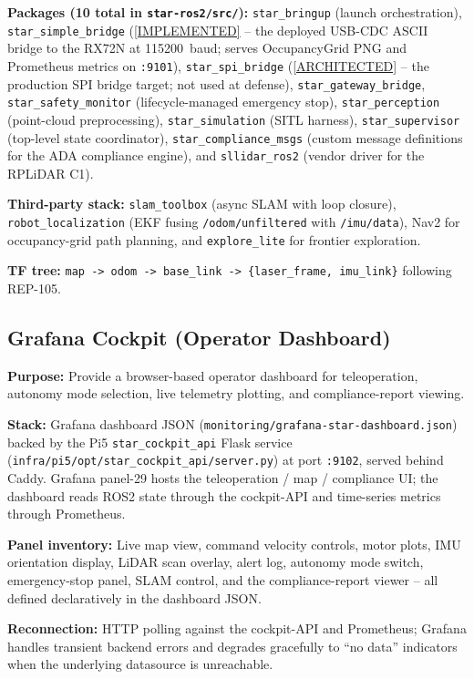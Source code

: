 \documentclass[11pt,letterpaper]{article}
\newcommand{\statuslabel}[1]{\hyperref[sec:status-legend]{[#1]}}
\begin{document}
\textbf{Packages (10 total in \texttt{star-ros2/src/}):}
\texttt{star\_bringup} (launch orchestration),
\texttt{star\_simple\_bridge} (\statuslabel{IMPLEMENTED} -- the deployed
USB-CDC ASCII bridge to the RX72N at 115200~baud; serves
OccupancyGrid PNG and Prometheus metrics on \texttt{:9101}),
\texttt{star\_spi\_bridge} (\statuslabel{ARCHITECTED} -- the production
SPI bridge target; not used at defense),
\texttt{star\_gateway\_bridge}, \texttt{star\_safety\_monitor}
(lifecycle-managed emergency stop), \texttt{star\_perception}
(point-cloud preprocessing), \texttt{star\_simulation} (SITL harness),
\texttt{star\_supervisor} (top-level state coordinator),
\texttt{star\_compliance\_msgs} (custom message definitions for the
ADA compliance engine), and \texttt{sllidar\_ros2} (vendor driver for
the RPLiDAR C1).

\textbf{Third-party stack:} \texttt{slam\_toolbox} (async SLAM with
loop closure), \texttt{robot\_localization} (EKF fusing
\texttt{/odom/unfiltered} with \texttt{/imu/data}), Nav2 for
occupancy-grid path planning, and \texttt{explore\_lite} for frontier
exploration.

\textbf{TF tree:} \texttt{map -> odom -> base\_link -> \{laser\_frame,
imu\_link\}} following REP-105.

\subsection{Grafana Cockpit (Operator Dashboard)}
\textbf{Purpose:} Provide a browser-based operator dashboard for
teleoperation, autonomy mode selection, live telemetry plotting, and
compliance-report viewing.

\textbf{Stack:} Grafana dashboard JSON
(\texttt{monitoring/grafana-star-dashboard.json}) backed by the Pi5
\texttt{star\_cockpit\_api} Flask service
(\texttt{infra/pi5/opt/star\_cockpit\_api/server.py}) at port
\texttt{:9102}, served behind Caddy. Grafana panel-29 hosts the
teleoperation / map / compliance UI; the dashboard reads ROS2 state
through the cockpit-API and time-series metrics through Prometheus.

\textbf{Panel inventory:} Live map view, command velocity controls,
motor plots, IMU orientation display, LiDAR scan overlay, alert log,
autonomy mode switch, emergency-stop panel, SLAM control, and the
compliance-report viewer -- all defined declaratively in the
dashboard JSON.

\textbf{Reconnection:} HTTP polling against the cockpit-API and
Prometheus; Grafana handles transient backend errors and degrades
gracefully to ``no data'' indicators when the underlying datasource
is unreachable.
\end{document}
